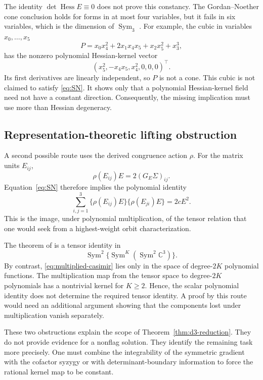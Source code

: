 \documentclass[12pt,a4paper]{article}
\theoremstyle{plain}
\theoremstyle{definition}
\newcommand{\C}{\mathbb{C}}
\newcommand{\Sym}{\operatorname{Sym}}
\newcommand{\Hess}{\operatorname{Hess}}
\begin{document}
The identity $\det\Hess E\equiv0$ does not prove this constancy.
The Gordan--Noether cone conclusion holds for forms in at most four variables, but it fails in six variables, which is the dimension of $\Sym_3$ \citep{lossen2004,ciliberto2008}.
For example, the cubic in variables $x_0,\ldots,x_5$ \citep{perazzo1900,gondimrusso2015}
\begin{equation*}
    P
    =
    x_0x_4^2+2x_1x_4x_5+x_2x_5^2+x_3^3
    ,
\end{equation*}
has the nonzero polynomial Hessian-kernel vector
\begin{equation*}
    (x_5^2,-x_4x_5,x_4^2,0,0,0)^\top
    .
\end{equation*}
Its first derivatives are linearly independent, so $P$ is not a cone.
This cubic is not claimed to satisfy \eqref{eq:SN}.
It shows only that a polynomial Hessian-kernel field need not have a constant direction.
Consequently, the missing implication must use more than Hessian degeneracy.

\subsection{Representation-theoretic lifting obstruction}
\label{supp:representation-obstruction}

A second possible route uses the derived congruence action $\rho$.
For the matrix units $E_{ij}$,
\begin{equation*}
    \rho(E_{ij})E
    =
    2(G_E\Sigma)_{ij}
    .
\end{equation*}
Equation~\eqref{eq:SN} therefore implies the polynomial identity
\begin{equation}
\label{eq:multiplied-casimir}
    \sum_{i,j=1}^3
    \{\rho(E_{ij})E\}
    \{\rho(E_{ji})E\}
    =
    2cE^2
    .
\end{equation}
This is the image, under polynomial multiplication, of the tensor relation that one would seek from a highest-weight orbit characterization.

The theorem of \citet{lichtenstein1982} is a tensor identity in
\begin{equation*}
    \operatorname{Sym}^2
    \{\operatorname{Sym}^K(\operatorname{Sym}^2\C^3)\}
    .
\end{equation*}
By contrast, \eqref{eq:multiplied-casimir} lies only in the space of degree-$2K$ polynomial functions.
The multiplication map from the tensor space to degree-$2K$ polynomials has a nontrivial kernel for $K\ge2$.
Hence, the scalar polynomial identity does not determine the required tensor identity.
A proof by this route would need an additional argument showing that the components lost under multiplication vanish separately.

These two obstructions explain the scope of Theorem~\ref{thm:d3-reduction}.
They do not provide evidence for a nonflag solution.
They identify the remaining task more precisely.
One must combine the integrability of the symmetric gradient with the cofactor syzygy or with determinant-boundary information to force the rational kernel map to be constant.
\end{document}
